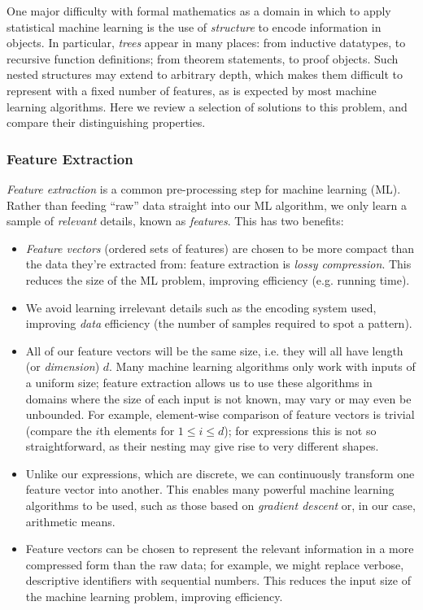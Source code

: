 One major difficulty with formal mathematics as a domain in which to apply
statistical machine learning is the use of \emph{structure} to encode
information in objects. In particular, \emph{trees} appear in many places: from
inductive datatypes, to recursive function definitions; from theorem statements,
to proof objects. Such nested structures may extend to arbitrary depth, which
makes them difficult to represent with a fixed number of features, as is
expected by most machine learning algorithms. Here we review a selection of
solutions to this problem, and compare their distinguishing properties.

\subsubsection{Feature Extraction}\label{sec:featureextraction}

\emph{Feature extraction} is a common pre-processing step for machine learning
(ML). Rather than feeding ``raw'' data straight into our ML algorithm, we only
learn a sample of \emph{relevant} details, known as \emph{features}. This has
two benefits:

\begin{itemize}
\item \emph{Feature vectors} (ordered sets of features) are chosen to be more
  compact than the data they're extracted from: feature extraction is
  \emph{lossy compression}. This reduces the size of the ML problem, improving
  efficiency (e.g. running time).
\item We avoid learning irrelevant details such as the encoding system used,
  improving \emph{data} efficiency (the number of samples required to spot a
  pattern).
\item All of our feature vectors will be the same size, i.e. they will all have
  length (or \emph{dimension}) $d$. Many machine learning algorithms only work
  with inputs of a uniform size; feature extraction allows us to use these
  algorithms in domains where the size of each input is not known, may vary or
  may even be unbounded. For example, element-wise comparison of feature vectors
  is trivial (compare the $i$th elements for $1 \leq i \leq d$); for expressions
  this is not so straightforward, as their nesting may give rise to very
  different shapes.
\item Unlike our expressions, which are discrete, we can continuously transform
  one feature vector into another. This enables many powerful machine learning
  algorithms to be used, such as those based on \emph{gradient descent} or, in
  our case, arithmetic means.
\item Feature vectors can be chosen to represent the relevant information in a
  more compressed form than the raw data; for example, we might replace verbose,
  descriptive identifiers with sequential numbers. This reduces the input size
  of the machine learning problem, improving efficiency.
\end{itemize}

